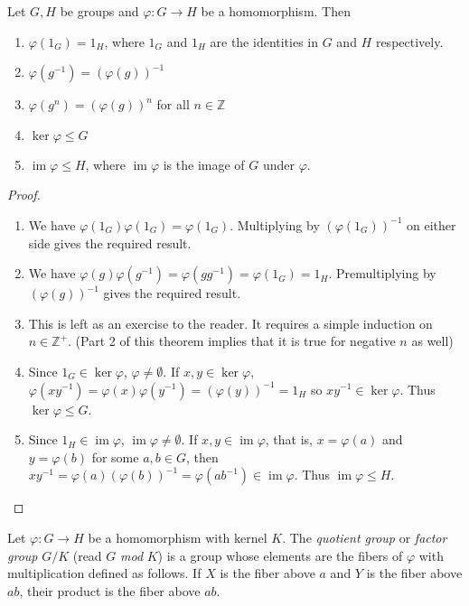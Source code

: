 \begin{theorem}
    Let $G,H$ be groups and $\varphi:G\to H$ be a homomorphism. Then
    \begin{enumerate}
        \item $\varphi(1_G)=1_H$, where $1_G$ and $1_H$ are the identities in $G$ and $H$ respectively.
        \item $\varphi(g^{-1})=(\varphi(g))^{-1}$
        \item $\varphi(g^n)=(\varphi(g))^n$ for all $n\in\mathbb{Z}$
        \item $\ker\varphi\leq G$
        \item $\operatorname{im}\varphi\leq H$, where $\operatorname{im}\varphi$ is the image of $G$ under $\varphi$.
    \end{enumerate}
\end{theorem}
\begin{proof}
\phantom{owo}
\begin{enumerate}
    \item We have $\varphi(1_G)\varphi(1_G)=\varphi(1_G)$. Multiplying by $(\varphi(1_G))^{-1}$ on either side gives the required result.
    \item We have $\varphi(g)\varphi(g^{-1})=\varphi(gg^{-1})=\varphi(1_G)=1_H$. Premultiplying by $(\varphi(g))^{-1}$ gives the required result.
    \item This is left as an exercise to the reader. It requires a simple induction on $n\in\mathbb{Z}^+$. (Part 2 of this theorem implies that it is true for negative $n$ as well)
    \item Since $1_G\in\ker\varphi$, $\varphi\neq\emptyset$. If $x,y\in\ker\varphi$, $\varphi(xy^{-1})=\varphi(x)\varphi(y^{-1})=(\varphi(y))^{-1}=1_H$ so $xy^{-1}\in\ker\varphi$. Thus $\ker\varphi\leq G$.
    \item Since $1_H\in\operatorname{im}\varphi$, $\operatorname{im}\varphi\neq\emptyset$. If $x,y\in\operatorname{im}\varphi$, that is, $x=\varphi(a)$ and $y=\varphi(b)$ for some $a,b\in G$, then $xy^{-1}=\varphi(a)(\varphi(b))^{-1}=\varphi(ab^{-1})\in\operatorname{im}\varphi$. Thus $\operatorname{im}\varphi\leq H$.
\end{enumerate}
\end{proof}

\begin{definition}
    Let $\varphi:G\to H$ be a homomorphism with kernel $K$. The \textit{quotient group} or \textit{factor group} $G/K$ (read $G$ \textit{mod} $K$) is a group whose elements are the fibers of $\varphi$ with multiplication defined as follows. If $X$ is the fiber above $a$ and $Y$ is the fiber above $ab$, their product is the fiber above $ab$. 
\end{definition}

